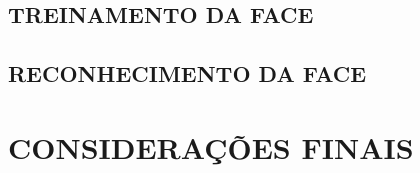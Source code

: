 \subsection{TREINAMENTO DA FACE}\label{subsec:treiamento}

\subsection{RECONHECIMENTO DA FACE}\label{subsec:reconhecimento}



\section{CONSIDERAÇÕES FINAIS}\label{sec:revbib_consid_finais}






















